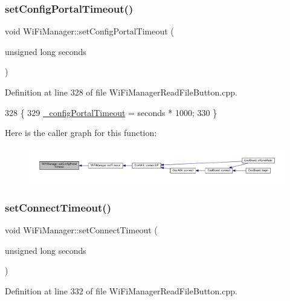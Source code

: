 \subsubsection{\texorpdfstring{set\+Config\+Portal\+Timeout()}{setConfigPortalTimeout()}}
{\footnotesize\ttfamily void Wi\+Fi\+Manager\+::set\+Config\+Portal\+Timeout (\begin{DoxyParamCaption}\item[{unsigned long}]{seconds }\end{DoxyParamCaption})}



Definition at line 328 of file Wi\+Fi\+Manager\+Read\+File\+Button.\+cpp.


\begin{DoxyCode}
328                                                               \{
329   \hyperlink{class_wi_fi_manager_ae6c969ba67e0a029dcde1c3511ca79b7}{\_configPortalTimeout} = seconds * 1000;
330 \}
\end{DoxyCode}
Here is the caller graph for this function\+:\nopagebreak
\begin{figure}[H]
\begin{center}
\leavevmode
\includegraphics[width=350pt]{d4/dc8/class_wi_fi_manager_a904006cb4d2c769e93bfdef336853766_icgraph}
\end{center}
\end{figure}
\mbox{\label{class_wi_fi_manager_a508fa98e77d165b29764f68d48b7a349}} 
\subsubsection{\texorpdfstring{set\+Connect\+Timeout()}{setConnectTimeout()}}
{\footnotesize\ttfamily void Wi\+Fi\+Manager\+::set\+Connect\+Timeout (\begin{DoxyParamCaption}\item[{unsigned long}]{seconds }\end{DoxyParamCaption})}



Definition at line 332 of file Wi\+Fi\+Manager\+Read\+File\+Button.\+cpp.


